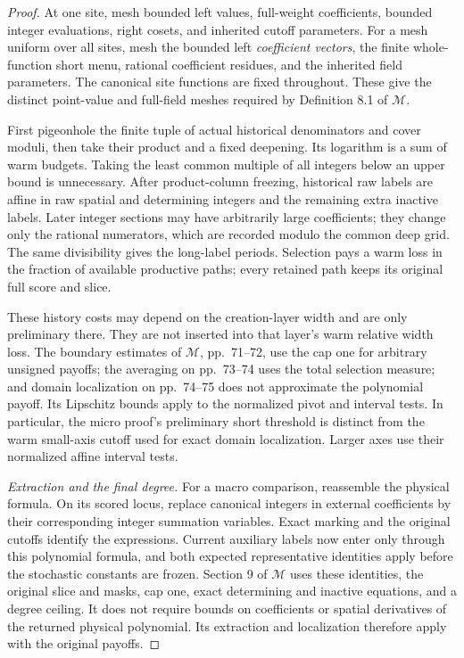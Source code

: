 \documentclass[11pt,a4paper]{article}
\theoremstyle{definition}
\newcommand{\M}{\mathcal M}
\begin{document}
\begin{proof}
At one site, mesh bounded left values, full-weight coefficients,
bounded integer evaluations, right cosets, and inherited cutoff
parameters. For a mesh uniform over all sites, mesh the bounded
left \emph{coefficient vectors}, the finite whole-function short
menu, rational coefficient residues, and the inherited field
parameters. The canonical site functions are fixed throughout.
These give the distinct point-value and full-field meshes required
by Definition 8.1 of \(\M\).

First pigeonhole the finite tuple of actual historical denominators
and cover moduli, then take their product and a fixed deepening.
Its logarithm is a sum of warm budgets. Taking the least common
multiple of all integers below an upper bound is unnecessary.
After product-column freezing, historical raw labels are affine
in raw spatial and determining integers and the remaining extra
inactive labels. Later integer sections may have arbitrarily large coefficients;
they change only the rational numerators, which are recorded
modulo the common deep grid. The same divisibility gives the
long-label periods. Selection pays a warm loss in the fraction of
available productive paths; every retained path keeps its original
full score and slice.

These history costs may depend on the creation-layer width and are
only preliminary there. They are not inserted into that layer's warm
relative width loss. The boundary estimates of \(\M\), pp.~71--72,
use the cap one for arbitrary unsigned payoffs; the averaging on
pp.~73--74 uses the total selection measure; and domain localization
on pp.~74--75 does not approximate the polynomial payoff. Its
Lipschitz bounds apply to the normalized pivot and interval tests.
In particular, the micro proof's preliminary short threshold is
distinct from the warm small-axis cutoff used for exact domain
localization. Larger axes use their normalized affine interval tests.

\textit{Extraction and the final degree.}
For a macro comparison, reassemble the physical formula. On its
scored locus, replace canonical integers in external coefficients
by their corresponding integer summation variables. Exact marking
and the original cutoffs identify the expressions. Current
auxiliary labels now enter only through this polynomial formula,
and both expected representative identities apply before the
stochastic constants are frozen. Section 9 of \(\M\) uses these
identities, the original slice and masks, cap one, exact
determining and inactive equations, and a degree ceiling. It
does not require bounds on coefficients or spatial derivatives
of the returned physical polynomial. Its extraction and
localization therefore apply with the original payoffs.


\end{proof}
\end{document}
